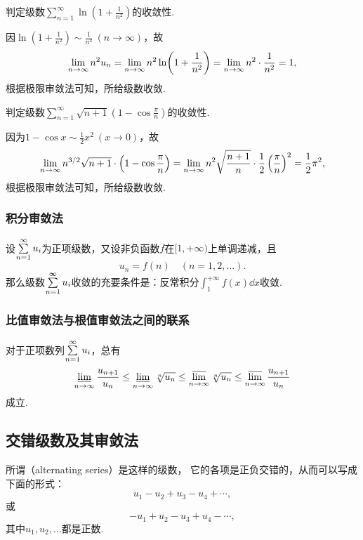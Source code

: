 \begin{example}
\def\s{\sum\limits_{n=1}^\infty }
判定级数\(\s \ln(1+\frac{1}{n^2})\)的收敛性.
\begin{solution}
因\(\ln(1+\frac{1}{n^2}) \sim \frac{1}{n^2}\ (n\to\infty)\)，故\[
\lim\limits_{n\to\infty} n^2 u_n = \lim\limits_{n\to\infty} n^2 \ln(1+\frac{1}{n^2})
= \lim\limits_{n\to\infty} n^2 \cdot \frac{1}{n^2} = 1,
\]根据极限审敛法可知，所给级数收敛.
\end{solution}
\end{example}

\begin{example}
\def\s{\sum\limits_{n=1}^\infty }
判定级数\(\s \sqrt{n+1} \left(1-\cos\frac{\pi}{n}\right)\)的收敛性.
\begin{solution}
因为\(1 - \cos x \sim \frac{1}{2} x^2\ (x\to0)\)，故\[
\lim\limits_{n\to\infty} n^{3/2} \sqrt{n+1} \cdot \left(1-\cos\frac{\pi}{n}\right)
= \lim\limits_{n\to\infty} n^2 \sqrt{\frac{n+1}{n}} \cdot \frac{1}{2} \left(\frac{\pi}{n}\right)^2
= \frac{1}{2} \pi^2,
\]根据极限审敛法可知，所给级数收敛.
\end{solution}
\end{example}

\subsubsection{积分审敛法}
\begin{theorem}[积分审敛法]\label{theorem:无穷级数.积分审敛法}
设\(\s u_i\)为正项级数，又设非负函数\(f\)在\([1,+\infty)\)上单调递减，且\[
u_n = f(n)
\quad(n=1,2,\dotsc).
\]那么级数\(\s u_i\)收敛的充要条件是：反常积分\(\int_1^{+\infty} f(x) \dd{x}\)收敛.
\end{theorem}

\subsubsection{比值审敛法与根值审敛法之间的联系}
\begin{theorem}
对于正项数列\(\s u_i\)，总有\[
\varliminf\limits_{n\to\infty} \frac{u_{n+1}}{u_n}
\leq
\varliminf\limits_{n\to\infty} \sqrt[n]{u_n}
\leq
\varlimsup\limits_{n\to\infty} \sqrt[n]{u_n}
\leq
\varlimsup\limits_{n\to\infty} \frac{u_{n+1}}{u_n}
\]成立.
\end{theorem}

\subsection{交错级数及其审敛法}
所谓（alternating series）是这样的级数，%
它的各项是正负交错的，从而可以写成下面的形式：\[
u_1 - u_2 + u_3 - u_4 + \dotsb,
\]或\[
-u_1 + u_2 - u_3 + u_4 - \dotsb,
\]其中\(u_1,u_2,\dotsc\)都是正数.

